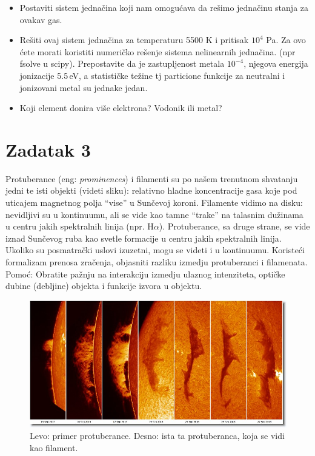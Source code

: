 \documentclass[12pt]{article}
\begin{document}
\begin{itemize}
    \item Postaviti sistem jedna\v{c}ina koji nam omogu\'{c}ava da re\v{s}imo jedna\v{c}inu stanja za ovakav gas. 
    \item Re\v{s}iti ovaj sistem jedna\v{c}ina za temperaturu 5500 K i pritisak $10^4$ Pa. Za ovo \'{c}ete morati koristiti numeri\v{c}ko re\v{s}enje sistema nelinearnih jedna\v{c}ina. (npr fsolve u scipy). Prepostavite da je zastupljenost metala $10^{-4}$, njegova energija jonizacije 5.5\,eV, a statisti\v{c}ke te\v{z}ine tj particione funkcije za neutralni i jonizovani metal su jednake jedan.
    \item Koji element donira vi\v{s}e elektrona? Vodonik ili metal?
\end{itemize}

\section*{Zadatak 3}

Protuberance (eng: \emph{prominences}) i filamenti su po na\v{s}em trenutnom shvatanju jedni te isti objekti (videti sliku): relativno hladne koncentracije gasa koje pod uticajem magnetnog polja ``vise'' u Sun\v{c}evoj koroni. Filamente vidimo na disku: nevidljivi su u kontinuumu, ali se vide kao tamne ``trake'' na talasnim du\v{z}inama u centru jakih spektralnih linija (npr. H$\alpha$). Protuberance, sa druge strane, se vide iznad Sun\v{c}evog ruba kao svetle formacije u centru jakih spektralnih linija. Ukoliko su posmatra\v{c}ki uslovi izuzetni, mogu se videti i u kontinuumu. Koriste\'{c}i formalizam prenosa zra\v{c}enja, objasniti razliku izmedju protuberanci i filamenata. Pomo\'{c}: Obratite pa\v{z}nju na interakciju izmedju ulaznog intenziteta, opti\v{c}ke dubine (debljine) objekta i funkcije izvora u objektu.

\begin{figure}
\includegraphics[width=\textwidth]{promfil.jpg}
\caption{Levo: primer protuberance. Desno: ista ta protuberanca, koja se vidi kao filament.}
\end{figure}
\end{document}
